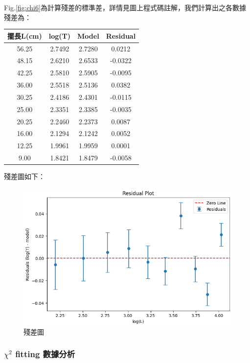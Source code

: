 \documentclass[12pt,a4paper]{article}
\begin{document}
\begin{CJK}{UTF8}{bkai}
\indent Fig.\ref{fig:chi6}為計算殘差的標準差，詳情見圖上程式碼註解，我們計算出之各數據殘差為：
\renewcommand{\arraystretch}{1.5}
\begin{center}
\begin{tabular}{|c|c|c|c|}
    \hline
    擺長L(cm)& log(T) & Model & Residual \\
    \hline
    56.25&2.7492&2.7280&0.0212 \\
    \hline
    48.15&2.6210&2.6533&-0.0322 \\
    \hline
    42.25 &2.5810&2.5905&-0.0095 \\
    \hline
    36.00 &2.5518&2.5136&0.0382 \\
    \hline
    30.25 &2.4186&2.4301&-0.0115 \\
    \hline
    25.00 &2.3351&2.3385&-0.0035 \\
    \hline
    20.25&2.2460&2.2373&0.0087\\
    \hline
    16.00&2.1294&2.1242&0.0052\\
    \hline
    12.25&1.9961&1.9959&0.0001\\
    \hline
    9.00&1.8421&1.8479&-0.0058\\
    \hline
\end{tabular}
\end{center}

\clearpage

\indent 殘差圖如下：

\begin{figure}[h]
    \centering
    \includegraphics[width=1\linewidth]{aaaaaaaaaaaaaaaa.png}
    \caption{殘差圖}
    \label{fig:chiB}
\end{figure}

\subsubsection{$\chi^2$ fitting 數據分析}
\hfill


\end{CJK}
\end{document}
